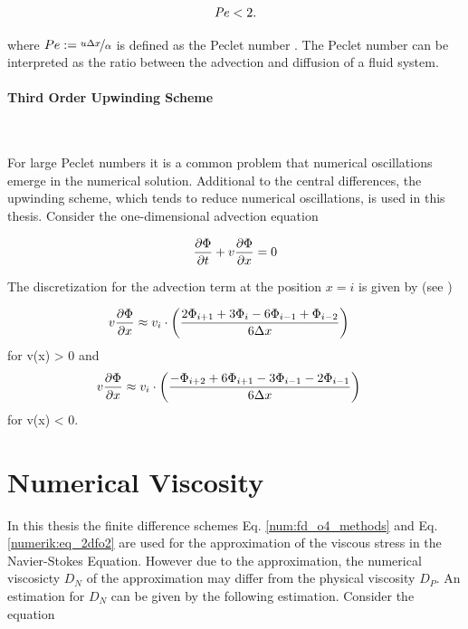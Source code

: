 \begin{align}
    \Pe  < 2.
\end{align}

where $ Pe := \nicefrac{u \Delta x}{\alpha}$ is defined as the Peclet number \citep{ferziger99}.
The Peclet number can be interpreted as the ratio between the advection and diffusion of a fluid system.

\paragraph{Third Order Upwinding Scheme}\mbox{}\\
\label{num:sec_para:upwindingscheme}

For large Peclet numbers it is a common problem that numerical oscillations emerge in the numerical solution.
Additional to the central differences, the upwinding scheme, which tends to reduce
numerical oscillations, is used in this thesis. Consider the one-dimensional advection equation

\begin{align}
    \pdn[\Phi]{t} + v\pdn[\Phi]{x} = 0
\end{align}

The discretization for the advection term at the position $x=i$ is given by (see \citep{FINDQUOTE})

\begin{align}
    v\pdn[\Phi]{x} &\approx  v_i \cdot \left(\frac{2\Phi_{i+1} + 3\Phi_i     - 6\Phi_{i-1} + \Phi_{i-2}}{6\Delta x}\right)
\end{align}
for v(x) > 0 and
\begin{align}
    v\pdn[\Phi]{x} &\approx  v_i \cdot \left( \frac{-\Phi_{i+2} + 6\Phi_{i+1} - 3\Phi_{i-1} - 2\Phi_{i-1}}{6\Delta x}\right)
\end{align}
for v(x) < 0.

\newpage

\section{Numerical Viscosity}

In this thesis the finite difference schemes Eq.  \ref{num:fd_o4_methods} and Eq.  \ref{numerik:eq_2dfo2}
are used for the approximation of the viscous stress in the Navier-Stokes Equation.
However due to the approximation, the numerical viscosicty $D_N$ of the approximation may differ from the physical viscosity $D_P$.
An estimation for $D_N$ can be given by the following estimation. Consider the  equation

